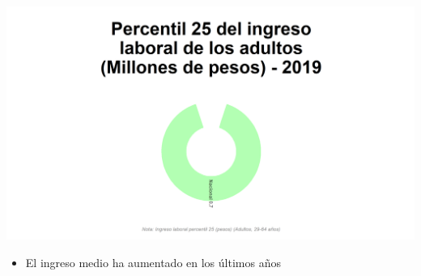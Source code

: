 \documentclass[aspectratio=169]{beamer}
\begin{document}
    \begin{slide}{3} 
                      \begin{imagecolumn}
                      
                    \includegraphics{img/var_10_static.png}
            \end{imagecolumn}
            \begin{textcolumn}
                \begin{itemize}
                    \item El ingreso medio ha aumentado en los últimos años
                \end{itemize}
            \end{textcolumn}

    \printcolumns
    \end{slide}
\end{document}

